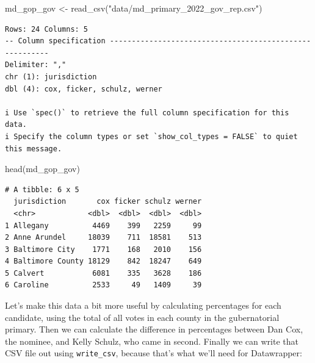 \documentclass[
  letterpaper,
  DIV=11,
  numbers=noendperiod]{scrreprt}
\newenvironment{Shaded}{\begin{snugshade}}{\end{snugshade}}
\newcommand{\FunctionTok}[1]{\textcolor[rgb]{0.28,0.35,0.67}{#1}}
\newcommand{\NormalTok}[1]{\textcolor[rgb]{0.00,0.23,0.31}{#1}}
\newcommand{\OtherTok}[1]{\textcolor[rgb]{0.00,0.23,0.31}{#1}}
\newcommand{\StringTok}[1]{\textcolor[rgb]{0.13,0.47,0.30}{#1}}
\begin{document}
\begin{Shaded}
\begin{Highlighting}[]
\NormalTok{md\_gop\_gov }\OtherTok{\textless{}{-}} \FunctionTok{read\_csv}\NormalTok{(}\StringTok{"data/md\_primary\_2022\_gov\_rep.csv"}\NormalTok{)}
\end{Highlighting}
\end{Shaded}

\begin{verbatim}
Rows: 24 Columns: 5
-- Column specification --------------------------------------------------------
Delimiter: ","
chr (1): jurisdiction
dbl (4): cox, ficker, schulz, werner

i Use `spec()` to retrieve the full column specification for this data.
i Specify the column types or set `show_col_types = FALSE` to quiet this message.
\end{verbatim}

\begin{Shaded}
\begin{Highlighting}[]
\FunctionTok{head}\NormalTok{(md\_gop\_gov)}
\end{Highlighting}
\end{Shaded}

\begin{verbatim}
# A tibble: 6 x 5
  jurisdiction       cox ficker schulz werner
  <chr>            <dbl>  <dbl>  <dbl>  <dbl>
1 Allegany          4469    399   2259     99
2 Anne Arundel     18039    711  18581    513
3 Baltimore City    1771    168   2010    156
4 Baltimore County 18129    842  18247    649
5 Calvert           6081    335   3628    186
6 Caroline          2533     49   1409     39
\end{verbatim}

Let's make this data a bit more useful by calculating percentages for
each candidate, using the total of all votes in each county in the
gubernatorial primary. Then we can calculate the difference in
percentages between Dan Cox, the nominee, and Kelly Schulz, who came in
second. Finally we can write that CSV file out using
\texttt{write\_csv}, because that's what we'll need for Datawrapper:
\end{document}

